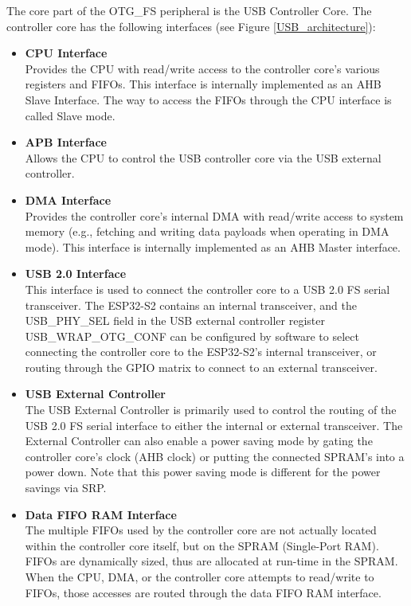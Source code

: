 \documentclass[main\_\_EN.tex]{subfiles}
\begin{document}
The core part of the OTG\_FS peripheral is the USB Controller Core. The controller core has the following interfaces (see Figure \ref{USB_architecture}):

\begin{itemize}
    \item {\bfseries CPU Interface}\\
    Provides the CPU with read/write access to the controller core’s various registers and FIFOs. This interface is internally implemented as an AHB Slave Interface. The way to access the FIFOs through the CPU interface is called Slave mode.

    \item {\bfseries APB Interface}\\
    Allows the CPU to control the USB controller core via the USB external controller.

    \item {\bfseries DMA Interface}\\
    Provides the controller core’s internal DMA with read/write access to system memory (e.g., fetching and writing data payloads when operating in DMA mode). This interface is internally implemented as an AHB Master interface.

    \item {\bfseries USB 2.0 Interface}\\
    This interface is used to connect the controller core to a USB 2.0 FS serial transceiver. The ESP32-S2 contains an internal transceiver, and the USB\_PHY\_SEL field in the USB external controller register USB\_WRAP\_OTG\_CONF can be configured by software to select connecting the controller core to the ESP32-S2’s internal transceiver, or routing through the GPIO matrix to connect to an external transceiver.

    \item {\bfseries USB External Controller}\\
    The USB External Controller is primarily used to control the routing of the USB 2.0 FS serial interface to either the internal or external transceiver. The External Controller can also enable a power saving mode by gating the controller core's clock (AHB clock) or putting the connected SPRAM's into a power down. Note that this power saving mode is different for the power savings via SRP.

    \item {\bfseries Data FIFO RAM Interface}\\
    The multiple FIFOs used by the controller core are not actually located within the controller core itself, but on the SPRAM (Single-Port RAM). FIFOs are dynamically sized, thus are allocated at run-time in the SPRAM. When the CPU, DMA, or the controller core attempts to read/write to FIFOs, those accesses are routed through the data FIFO RAM interface.
\end{itemize}
\end{document}
